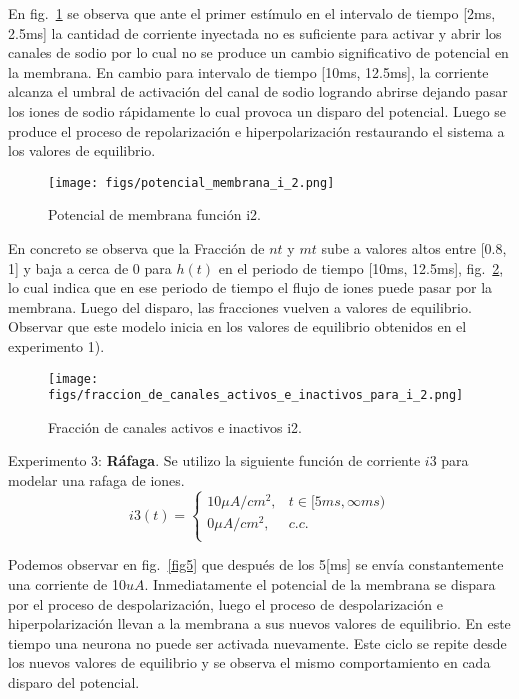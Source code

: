 \documentclass[aps,prl,twocolumn,groupedaddress]{revtex4-2}
\begin{document}
En fig.~\ref{fig3} se observa que ante el primer estímulo en el intervalo de tiempo [2ms, 2.5ms] la cantidad de corriente inyectada no es suficiente para activar y abrir los canales de sodio por lo cual no se produce un cambio significativo de potencial en la membrana. En cambio para intervalo de tiempo [10ms, 12.5ms], la corriente alcanza el umbral de activación del canal de sodio logrando abrirse dejando pasar los iones de sodio rápidamente lo cual provoca un disparo del potencial. Luego se produce el proceso de repolarización e hiperpolarización  restaurando el sistema a los valores de equilibrio.\\


\begin{figure}[h!]
\centering
\texttt{[image: figs/potencial\_membrana\_i\_2.png]}
\caption{Potencial de membrana función i2. \label{fig3}}
\end{figure}

En concreto se observa que la Fracción de $nt$ y $mt$ sube a valores altos entre [0.8, 1] y baja a cerca de  0 para $h(t)$ en el periodo de tiempo [10ms, 12.5ms], 
fig.~\ref{fig4}, lo cual indica que en ese periodo de tiempo el flujo de iones puede pasar por la membrana.
Luego del disparo, las fracciones vuelven a valores de equilibrio.
Observar que este modelo inicia en los valores de equilibrio obtenidos en el experimento 1).\\



\begin{figure}[h!]
\centering
\texttt{[image: figs/fraccion\_de\_canales\_activos\_e\_inactivos\_para\_i\_2.png]}
\caption{Fracción de canales activos e inactivos i2. \label{fig4}}
\end{figure}

Experimento 3: \textbf{Ráfaga}. Se utilizo la siguiente función de corriente $i3$ para modelar una rafaga de iones.
$$
i3(t) = \left\{
\begin{array}{ll}
10 \mu A/cm^2, & t\in [5ms,\infty ms) \\
0 \mu A/cm^2, & c.c. \\
\end{array}
\right.
$$

Podemos observar en fig.~\ref{fig5} que después de los  5[ms] se envía constantemente una corriente de 10$uA$. Inmediatamente el potencial de la membrana se dispara por el proceso de despolarización, luego el proceso de despolarización e hiperpolarización llevan  a la membrana a sus nuevos valores de equilibrio. En este tiempo una neurona no puede ser activada nuevamente. Este ciclo se repite desde los nuevos valores de equilibrio y se observa el mismo comportamiento en cada disparo del potencial.\\
\end{document}
